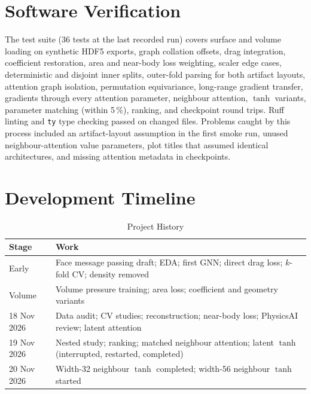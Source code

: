 \documentclass[journal]{IEEEtran}
\begin{document}
\section{Software Verification}
The test suite (36 tests at the last recorded run) covers surface and volume
loading on synthetic HDF5 exports, graph collation offsets, drag integration,
coefficient restoration, area and near-body loss weighting, scaler edge cases,
deterministic and disjoint inner splits, outer-fold parsing for both artifact
layouts, attention graph isolation, permutation equivariance, long-range
gradient transfer, gradients through every attention parameter, neighbour
attention, $\tanh$ variants, parameter matching (within 5\,\%), ranking, and
checkpoint round trips. Ruff linting and \texttt{ty} type checking passed on
changed files. Problems caught by this process included an artifact-layout
assumption in the first smoke run, unused neighbour-attention value
parameters, plot titles that assumed identical architectures, and missing
attention metadata in checkpoints.

\section{Development Timeline}
\begin{table}[!h]
\centering
\caption{Project History}
\setlength{\tabcolsep}{3pt}
\begin{tabular}{p{}p{}}
\toprule
Stage & Work \\
\midrule
Early & Face message passing draft; EDA; first GNN; direct drag loss; $k$-fold CV; density removed \\
Volume & Volume pressure training; area loss; coefficient and geometry variants \\
18 Nov 2026 & Data audit; CV studies; reconstruction; near-body loss; PhysicsAI review; latent attention \\
19 Nov 2026 & Nested study; ranking; matched neighbour attention; latent $\tanh$ (interrupted, restarted, completed) \\
20 Nov 2026 & Width-32 neighbour $\tanh$ completed; width-56 neighbour $\tanh$ started \\
\bottomrule
\end{tabular}
\end{table}
\end{document}
